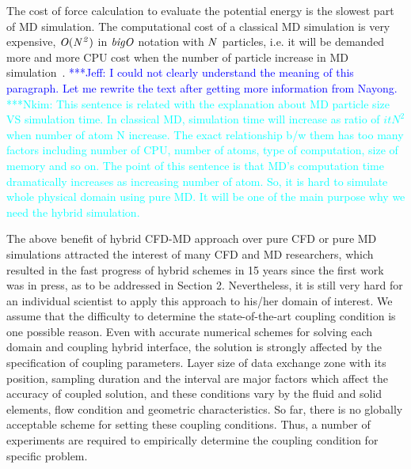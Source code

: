 \documentclass[conference,final]{IEEEtran}
\newcommand{\Nkimnote}[1]{ {\textcolor{cyan} { ***Nkim: #1 }}}
\newcommand{\skonote}[1]{ {\textcolor{blue} { ***Jeff: #1 }}}
\newcommand{\Nkimnote}[1]{}
\newcommand{\skonote}[1]{}
\begin{document}
The cost of force calculation to evaluate the potential energy is the slowest part of MD simulation. The computational cost of a classical MD simulation is very expensive, $\it O(N^{2})$ in $\it big O$ notation with $\it N$ particles, i.e. it will be demanded more and more CPU cost when the number of particle increase in MD simulation~\cite{Allen}.
\skonote{I could not clearly understand the meaning of this paragraph. Let me rewrite the text after getting more information from Nayong.}
\Nkimnote {This sentence is related with the explanation about MD particle size VS simulation time. In classical MD, simulation time will increase as ratio of $it N^{2}$ when number of atom N increase.  The exact relationship b/w them has too many factors including number of CPU, number of atoms, type of computation, size of memory and so on. The point of this sentence is that MD's computation time dramatically increases as increasing number of atom. So, it is hard to simulate whole physical domain using pure MD. It will be one of the main purpose why we need the hybrid simulation.}

The above benefit of hybrid CFD-MD approach over pure CFD or pure MD simulations attracted the interest of many CFD and MD researchers, which resulted in the fast progress of hybrid schemes in 15 years since the first work~\cite{Thompson} was in press, as to be addressed in Section 2. Nevertheless, it is still very hard for an individual scientist to apply this approach to his/her domain of interest. We assume that the difficulty to determine the state-of-the-art coupling condition is one possible reason. Even with accurate numerical schemes for solving each domain and coupling hybrid interface, the solution is strongly affected by the specification of coupling parameters. Layer size of data exchange zone with its position, sampling duration and the interval are major factors which affect the accuracy of coupled solution, and these conditions vary by the fluid and solid elements, flow condition and geometric characteristics.
So far, there is no globally acceptable scheme for setting these coupling conditions. Thus, a number of experiments are required to empirically determine the coupling condition for specific problem.
\end{document}
